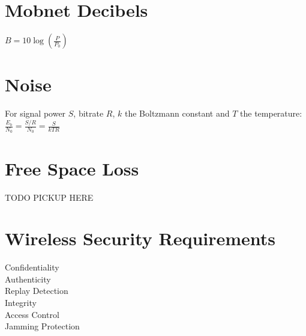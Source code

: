 \documentclass[11pt, a4paper,twocolumn]{scrartcl}
\begin{document}
\section{Mobnet Decibels}
$B = 10\log(\frac{P}{P_0})$

\section{Noise}
For signal power $S$, bitrate $R$, $k$ the Boltzmann constant and $T$ the temperature: $\frac{E_b}{N_0} = \frac{S/R}{N_0} = \frac{S}{kTR}$

\section{Free Space Loss}
TODO PICKUP HERE
\section{Wireless Security Requirements}

\begin{multicols}{2}
	\begin{description}
		\item[Confidentiality]
		\item[Authenticity]
		\item[Replay Detection]
		\item[Integrity]
		\item[Access Control]
		\item[Jamming Protection]
	\end{description}
\end{multicols}
\end{document}
